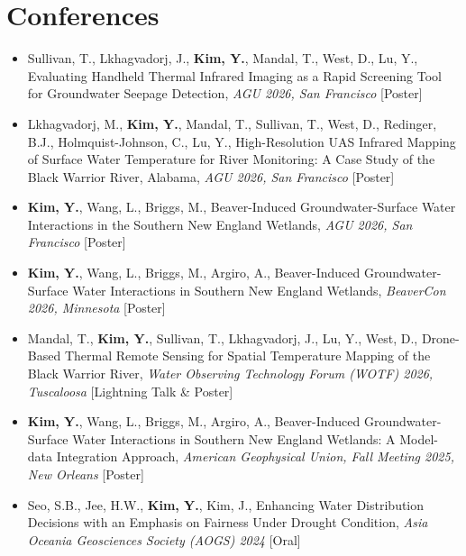 \section{Conferences}
\begin{itemize}
\vspace{-1.5em}
\item[\textbf{[11]}] Sullivan, T., Lkhagvadorj, J., \textbf{Kim, Y.}, Mandal, T., West, D., Lu, Y., Evaluating Handheld Thermal Infrared Imaging as a Rapid Screening Tool for Groundwater Seepage Detection, \textit{AGU 2026, San Francisco} [Poster]

\item[\textbf{[10]}] Lkhagvadorj, M., \textbf{Kim, Y.}, Mandal, T., Sullivan, T., West, D., Redinger, B.J., Holmquist-Johnson, C., Lu, Y., High-Resolution UAS Infrared Mapping of Surface Water Temperature for River Monitoring: A Case Study of the Black Warrior River, Alabama, \textit{AGU 2026, San Francisco} [Poster]

\item[\textbf{[9]}] \textbf{Kim, Y.}, Wang, L., Briggs, M., Beaver-Induced Groundwater-Surface Water Interactions in the Southern New England Wetlands, \textit{AGU 2026, San Francisco} [Poster]

\item[\textbf{[8]}] \textbf{Kim, Y.}, Wang, L., Briggs, M., Argiro, A., Beaver-Induced Groundwater-Surface Water Interactions in Southern New England Wetlands, \textit{BeaverCon 2026, Minnesota} [Poster]

\item[\textbf{[7]}] Mandal, T., \textbf{Kim, Y.}, Sullivan, T., Lkhagvadorj, J., Lu, Y., West, D., Drone-Based Thermal Remote Sensing for Spatial Temperature Mapping of the Black Warrior River, \textit{Water Observing Technology Forum (WOTF) 2026, Tuscaloosa} [Lightning Talk \& Poster]

\item[\textbf{[6]}] \textbf{Kim, Y.}, Wang, L., Briggs, M., Argiro, A., Beaver-Induced Groundwater-Surface Water Interactions in Southern New England Wetlands: A Model-data Integration Approach, \textit{American Geophysical Union, Fall Meeting 2025, New Orleans} [Poster]

\item[\textbf{[5]}] Seo, S.B., Jee, H.W., \textbf{Kim, Y.}, Kim, J., Enhancing Water Distribution Decisions with an Emphasis on Fairness Under Drought Condition, \textit{Asia Oceania Geosciences Society (AOGS) 2024} [Oral]


\end{itemize}
